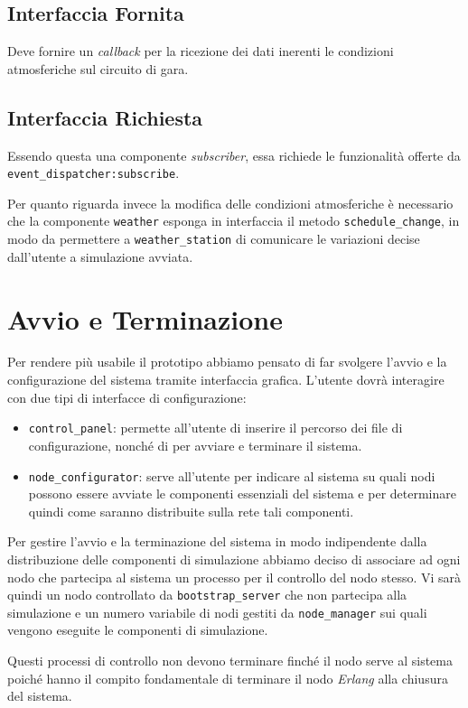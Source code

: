 \documentclass[a4paper]{report}
\newcommand{\Erlang}{\textsl{Erlang}}
\newcommand{\fun}[1]{\texttt{#1}}
\begin{document}
\subsection*{Interfaccia Fornita}
Deve fornire un \textit{callback} per la ricezione dei dati inerenti le condizioni atmosferiche sul circuito di gara.
\subsection*{Interfaccia Richiesta}
Essendo questa una componente \textit{subscriber}, essa richiede le funzionalità offerte da \fun{event\_dispatcher:subscribe}.

Per quanto riguarda invece la modifica delle condizioni atmosferiche è necessario che la componente \texttt{weather} esponga in interfaccia il metodo \fun{schedule\_change}, in modo da permettere a \texttt{weather\_station} di comunicare le variazioni decise dall'utente a simulazione avviata.

\section{Avvio e Terminazione}
\label{sec:start-stop}
Per rendere più usabile il prototipo abbiamo pensato di far svolgere l'avvio e la configurazione del sistema tramite interfaccia grafica.
L'utente dovrà interagire con due tipi di interfacce di configurazione:
\begin{itemize}
\item \texttt{control\_panel}: permette all'utente di inserire il percorso dei file di configurazione, nonché di per avviare e terminare il sistema.
\item \texttt{node\_configurator}: serve all'utente per indicare al sistema su quali nodi possono essere avviate le componenti essenziali del sistema e per determinare quindi come saranno distribuite sulla rete tali componenti.
\end{itemize}
Per gestire l'avvio e la terminazione del sistema in modo indipendente dalla distribuzione delle componenti di simulazione abbiamo deciso di associare ad ogni nodo che partecipa al sistema un processo per il controllo del nodo stesso. Vi sarà quindi un nodo controllato da \texttt{bootstrap\_server} che non partecipa alla simulazione e un numero variabile di nodi gestiti da \texttt{node\_manager} sui quali vengono eseguite le componenti di simulazione.

Questi processi di controllo non devono terminare finché il nodo serve al sistema poiché hanno il compito fondamentale di terminare il nodo \Erlang{} alla chiusura del sistema.
\end{document}
